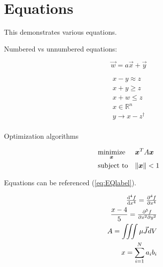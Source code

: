\section{Equations} \label{sec:Equations} 
  This demonstrates various equations.
  
  Numbered vs unnumbered equations:

  \begin{equation}
    \vec{w} = a \vec{x} + \vec{y}   %
  \end{equation}
  
  \begin{equation*}
    \begin{aligned}
      x - y \approx z \\            %
      x + y \ge z \\                %
      x + w \le z \\                %
      x \in \mathbb{R}^n \\         %
      y \to x - z^{\dagger} \\      %
    \end{aligned}
  \end{equation*}
  
  Optimization algorithms

  \begin{equation}
    \begin{aligned}
      & \underset{\bm{x}}{\text{minimize}}
      & & \bm{x}^T A \bm{x} \\
      & \text{subject to}
      & & \norm{\bm{x}} < 1 \\          %
    \label{eq:EQlabel}
    \end{aligned}
  \end{equation}
 
  Equations can be referenced (\ref{eq:EQlabel}).

 \begin{equation*}
  \begin{aligned}
      & & \od[4]{f}{x} = \pd[4]{f}{x} \\              %
      & & \frac{x - 4}{5} = \md{f}{5}{x}{2}{y}{2} \\  %
      & & A = \iiint \mu \vec{J} dV \\                %
      & & x = \sum_{i=1}^N a_ib_i \\                  %
  \end{aligned}
 \end{equation*}

